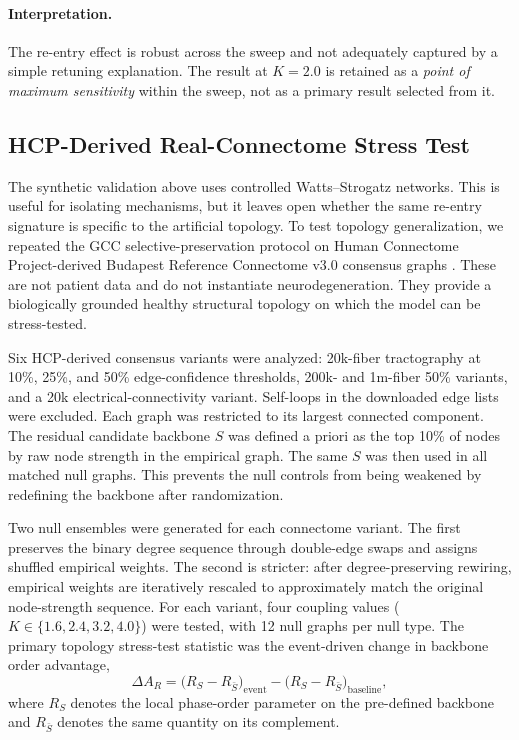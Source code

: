 \documentclass[11pt,a4paper]{article}
\theoremstyle{plain}
\theoremstyle{definition}
\theoremstyle{remark}
\begin{document}
\paragraph{Interpretation.} The re-entry effect is robust across the sweep and not adequately captured by a simple retuning explanation. The result at $K = 2.0$ is retained as a \emph{point of maximum sensitivity} within the sweep, not as a primary result selected from it.

\subsection{HCP-Derived Real-Connectome Stress Test}
\label{sec:hcp-connectome}

The synthetic validation above uses controlled Watts--Strogatz networks. This is useful for isolating mechanisms, but it leaves open whether the same re-entry signature is specific to the artificial topology. To test topology generalization, we repeated the GCC selective-preservation protocol on Human Connectome Project-derived Budapest Reference Connectome v3.0 consensus graphs \citep{szalkai2015,szalkai2017}. These are not patient data and do not instantiate neurodegeneration. They provide a biologically grounded healthy structural topology on which the model can be stress-tested.

Six HCP-derived consensus variants were analyzed: 20k-fiber tractography at 10\%, 25\%, and 50\% edge-confidence thresholds, 200k- and 1m-fiber 50\% variants, and a 20k electrical-connectivity variant. Self-loops in the downloaded edge lists were excluded. Each graph was restricted to its largest connected component. The residual candidate backbone $S$ was defined a priori as the top 10\% of nodes by raw node strength in the empirical graph. The same $S$ was then used in all matched null graphs. This prevents the null controls from being weakened by redefining the backbone after randomization.

Two null ensembles were generated for each connectome variant. The first preserves the binary degree sequence through double-edge swaps and assigns shuffled empirical weights. The second is stricter: after degree-preserving rewiring, empirical weights are iteratively rescaled to approximately match the original node-strength sequence. For each variant, four coupling values ($K \in \{1.6,2.4,3.2,4.0\}$) were tested, with 12 null graphs per null type. The primary topology stress-test statistic was the event-driven change in backbone order advantage,
\begin{equation}
\Delta A_R = \bigl(R_S - R_{\bar S}\bigr)_{\mathrm{event}} - \bigl(R_S - R_{\bar S}\bigr)_{\mathrm{baseline}},
\end{equation}
where $R_S$ denotes the local phase-order parameter on the pre-defined backbone and $R_{\bar S}$ denotes the same quantity on its complement.
\end{document}
